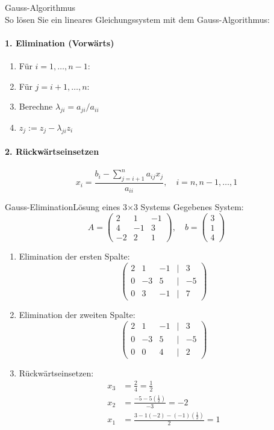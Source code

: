 \begin{KR}{Gauss-Algorithmus}\\
So lösen Sie ein lineares Gleichungssystem mit dem Gauss-Algorithmus:

\paragraph{1. Elimination (Vorwärts)}
\begin{enumerate}
    \item Für $i=1,\ldots,n-1$:
    \item \quad Für $j=i+1,\ldots,n$:
    \item \quad\quad Berechne $\lambda_{ji} = a_{ji}/a_{ii}$
    \item \quad\quad $z_j := z_j - \lambda_{ji} z_i$
\end{enumerate}

\paragraph{2. Rückwärtseinsetzen}
$$x_i = \frac{b_i - \sum_{j=i+1}^n a_{ij}x_j}{a_{ii}}, \quad i=n,n-1,\ldots,1$$
\end{KR}

\begin{example2}{Gauss-Elimination}{Lösung eines 3×3 Systems}
Gegebenes System:
$$A = \begin{pmatrix}
2 & 1 & -1\\
4 & -1 & 3\\
-2 & 2 & 1
\end{pmatrix}, \quad b = \begin{pmatrix}
3\\
1\\
4
\end{pmatrix}$$

\begin{enumerate}
    \item Elimination der ersten Spalte:
    $$\begin{pmatrix}
    2 & 1 & -1 & | & 3\\
    0 & -3 & 5 & | & -5\\
    0 & 3 & -1 & | & 7
    \end{pmatrix}$$
    
    \item Elimination der zweiten Spalte:
    $$\begin{pmatrix}
    2 & 1 & -1 & | & 3\\
    0 & -3 & 5 & | & -5\\
    0 & 0 & 4 & | & 2
    \end{pmatrix}$$
    
    \item Rückwärtseinsetzen:
    \begin{align*}
        x_3 &= \frac{2}{4} = \frac{1}{2}\\
        x_2 &= \frac{-5 - 5(\frac{1}{2})}{-3} = -2\\
        x_1 &= \frac{3 - 1(-2) - (-1)(\frac{1}{2})}{2} = 1
    \end{align*}
\end{enumerate}
\end{example2}

